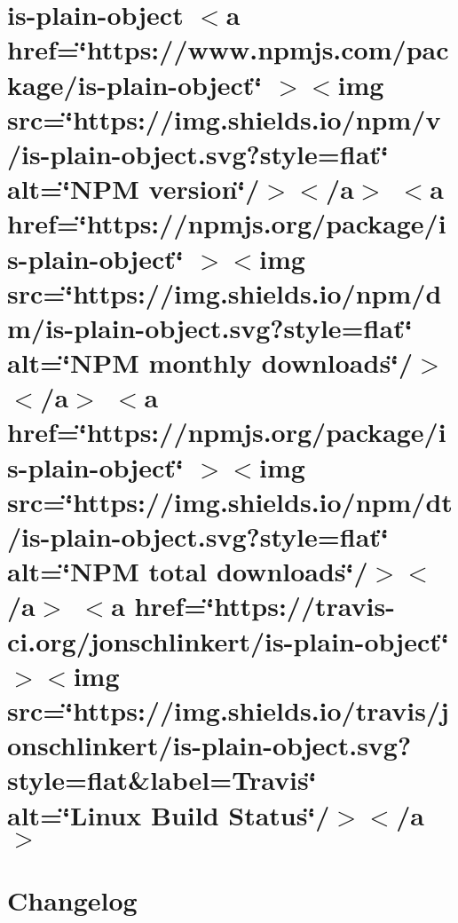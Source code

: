 \documentclass[twoside]{book}
\newcommand{\+}{\discretionary{\mbox{\scriptsize$\hookleftarrow$}}{}{}}
\begin{document}
\chapter{is-\/plain-\/object \texorpdfstring{$<$}{<}a href=\char`\"{}https\+://www.\+npmjs.\+com/package/is-\/plain-\/object\char`\"{} \texorpdfstring{$>$}{>}\texorpdfstring{$<$}{<}img src=\char`\"{}https\+://img.\+shields.\+io/npm/v/is-\/plain-\/object.\+svg?style=flat\char`\"{} alt=\char`\"{}\+NPM version\char`\"{}/\texorpdfstring{$>$}{>}\texorpdfstring{$<$}{<}/a\texorpdfstring{$>$}{>} \texorpdfstring{$<$}{<}a href=\char`\"{}https\+://npmjs.\+org/package/is-\/plain-\/object\char`\"{} \texorpdfstring{$>$}{>}\texorpdfstring{$<$}{<}img src=\char`\"{}https\+://img.\+shields.\+io/npm/dm/is-\/plain-\/object.\+svg?style=flat\char`\"{} alt=\char`\"{}\+NPM monthly downloads\char`\"{}/\texorpdfstring{$>$}{>}\texorpdfstring{$<$}{<}/a\texorpdfstring{$>$}{>} \texorpdfstring{$<$}{<}a href=\char`\"{}https\+://npmjs.\+org/package/is-\/plain-\/object\char`\"{} \texorpdfstring{$>$}{>}\texorpdfstring{$<$}{<}img src=\char`\"{}https\+://img.\+shields.\+io/npm/dt/is-\/plain-\/object.\+svg?style=flat\char`\"{} alt=\char`\"{}\+NPM total downloads\char`\"{}/\texorpdfstring{$>$}{>}\texorpdfstring{$<$}{<}/a\texorpdfstring{$>$}{>} \texorpdfstring{$<$}{<}a href=\char`\"{}https\+://travis-\/ci.\+org/jonschlinkert/is-\/plain-\/object\char`\"{} \texorpdfstring{$>$}{>}\texorpdfstring{$<$}{<}img src=\char`\"{}https\+://img.\+shields.\+io/travis/jonschlinkert/is-\/plain-\/object.\+svg?style=flat\&label=\+Travis\char`\"{} alt=\char`\"{}\+Linux Build Status\char`\"{}/\texorpdfstring{$>$}{>}\texorpdfstring{$<$}{<}/a\texorpdfstring{$>$}{>}}
\label{md__c___users_vaishnavi_jadhav__desktop__developer_code_mean_stack_example_client_node_modules_is_plain_object__r_e_a_d_m_e}

\chapter{Changelog}
\label{md__c___users_vaishnavi_jadhav__desktop__developer_code_mean_stack_example_client_node_modules_is_regex__c_h_a_n_g_e_l_o_g}

\end{document}
